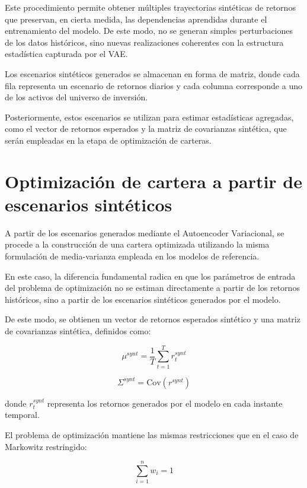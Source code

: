 Este procedimiento permite obtener múltiples trayectorias sintéticas de retornos que preservan, en cierta medida, las dependencias aprendidas durante el entrenamiento del modelo. De este modo, no se generan simples perturbaciones de los datos históricos, sino nuevas realizaciones coherentes con la estructura estadística capturada por el VAE.

Los escenarios sintéticos generados se almacenan en forma de matriz, donde cada fila representa un escenario de retornos diarios y cada columna corresponde a uno de los activos del universo de inversión.

Posteriormente, estos escenarios se utilizan para estimar estadísticas agregadas, como el vector de retornos esperados y la matriz de covarianzas sintética, que serán empleadas en la etapa de optimización de carteras.

\section{Optimización de cartera a partir de escenarios sintéticos}

A partir de los escenarios generados mediante el Autoencoder Variacional, se procede a la construcción de una cartera optimizada utilizando la misma formulación de media-varianza empleada en los modelos de referencia.

En este caso, la diferencia fundamental radica en que los parámetros de entrada del problema de optimización no se estiman directamente a partir de los retornos históricos, sino a partir de los escenarios sintéticos generados por el modelo.

De este modo, se obtienen un vector de retornos esperados sintético y una matriz de covarianzas sintética, definidos como:

\begin{equation}
\mu^{synt} = \frac{1}{T} \sum_{t=1}^{T} r_t^{synt}
\end{equation}

\begin{equation}
\Sigma^{synt} = \text{Cov}(r^{synt})
\end{equation}

donde $r_t^{synt}$ representa los retornos generados por el modelo en cada instante temporal.

El problema de optimización mantiene las mismas restricciones que en el caso de Markowitz restringido:

\begin{equation}
\sum_{i=1}^{n} w_i = 1
\end{equation}

